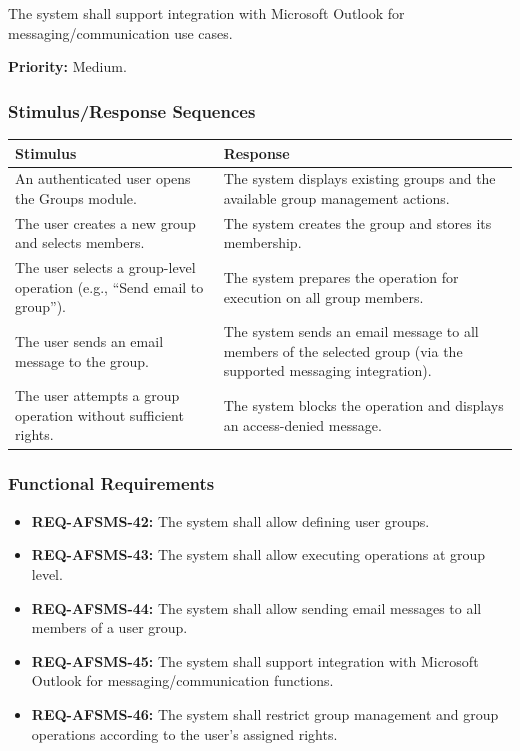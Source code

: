 \documentclass[11pt, a4paper]{article}
\begin{document}
The system shall support integration with Microsoft Outlook for messaging/communication use cases.

\textbf{Priority:} Medium.

\subsubsection{Stimulus/Response Sequences}
\begin{table}[H]
\begin{tabularx}{\textwidth}{>{\raggedright\arraybackslash}p{3.2cm} >{\raggedright\arraybackslash}X}
\toprule
\textbf{Stimulus} & \textbf{Response} \\
\midrule
An authenticated user opens the Groups module. & The system displays existing groups and the available group management actions. \\
\midrule
The user creates a new group and selects members. & The system creates the group and stores its membership. \\
\midrule
The user selects a group-level operation (e.g., ``Send email to group''). & The system prepares the operation for execution on all group members. \\
\midrule
The user sends an email message to the group. & The system sends an email message to all members of the selected group (via the supported messaging integration). \\
\midrule
The user attempts a group operation without sufficient rights. & The system blocks the operation and displays an access-denied message. \\
\bottomrule
\end{tabularx}
\end{table}

\subsubsection{Functional Requirements}
\begin{itemize}
    \item \textbf{REQ-AFSMS-42:} The system shall allow defining user groups.
    \item \textbf{REQ-AFSMS-43:} The system shall allow executing operations at group level.
    \item \textbf{REQ-AFSMS-44:} The system shall allow sending email messages to all members of a user group.
    \item \textbf{REQ-AFSMS-45:} The system shall support integration with Microsoft Outlook for messaging/communication functions.
    \item \textbf{REQ-AFSMS-46:} The system shall restrict group management and group operations according to the user's assigned rights.
\end{itemize}
\end{document}
